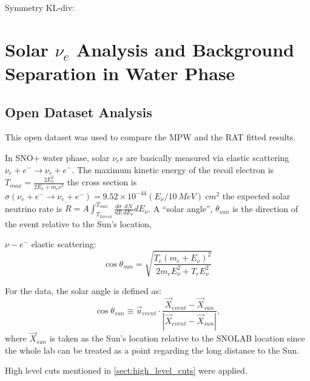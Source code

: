 Symmetry KL-div:



\section{Solar \texorpdfstring{$\nu_e$}{Lg} Analysis and Background Separation in Water Phase}
\subsection{Open Dataset Analysis}

This open dataset was used to compare the MPW and the RAT fitted results.

In SNO+ water phase, solar $\nu_e$s are basically measured via elastic scattering $\nu_e+e^-\to \nu_e+e^-$. The maximum kinetic energy of the recoil electron is
$T_{max}=\frac{2E^2_\nu}{2E_\nu+m_e c^2}$
the cross section is $\sigma(\nu_e+e^-\to \nu_e+e^-)=9.52\times 10^{-44}(E_\nu/10~MeV)~cm^2$
the expected solar neutrino rate is 
$R=A\int_{T_{thresh}}^{T_{max}}\frac{d\sigma}{dE}\frac{dN}{dE_\nu}dE_\nu$.
A ``solar angle'', $\theta_{sun}$ is the direction of the event relative to the Sun's location,


$\nu-e^-$ elastic scattering: 
\begin{equation}\label{eq:costhetaSun}
\cos\theta_{sun}=\sqrt{\frac{T_e(m_e+E_\nu)^2}{2m_eE_\nu^2+T_eE_\nu^2}}
\end{equation}

For the data, the solar angle is defined as:
\begin{equation}
	\cos\theta_{sun}\equiv \vec u_{event}\cdot \frac{\vec{X}_{event}-\vec{X}_{sun}}{|\vec{X}_{event}-\vec{X}_{sun}|},
\end{equation}
where $\vec{X}_{sun}$ is taken as the Sun's location relative to the SNOLAB location since the whole lab can be treated as a point regarding the long distance to the Sun.



High level cuts mentioned in \ref{sect:high_level_cuts} were applied.


